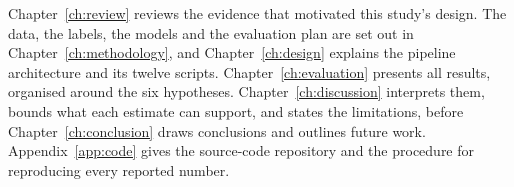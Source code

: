 Chapter~\ref{ch:review} reviews the evidence that motivated this study's design.
The data, the labels, the models and the evaluation plan are set out in
Chapter~\ref{ch:methodology}, and Chapter~\ref{ch:design} explains the pipeline
architecture and its twelve scripts.
Chapter~\ref{ch:evaluation} presents all results, organised around the six
hypotheses. Chapter~\ref{ch:discussion} interprets them, bounds what each
estimate can support, and states the limitations, before
Chapter~\ref{ch:conclusion} draws conclusions and outlines future work.
Appendix~\ref{app:code} gives the source-code repository and the procedure for
reproducing every reported number.
